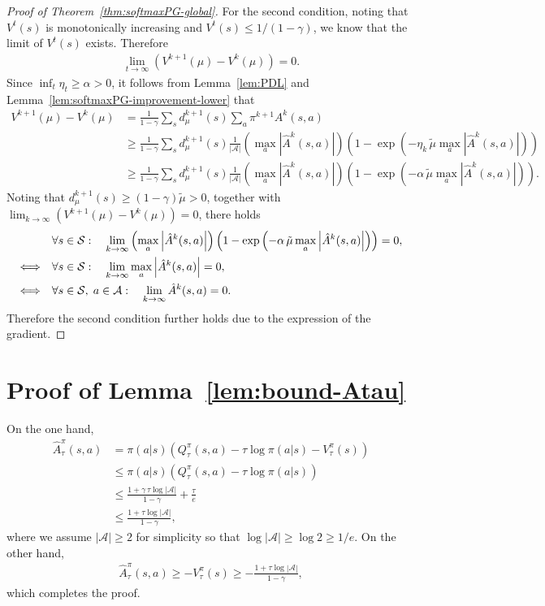 \begin{proof}[Proof of Theorem~\ref{thm:softmaxPG-global}]
    For the second condition, noting that $V^t(s)$ is monotonically increasing and $V^t(s) \leq 1/(1-\gamma)$, we know that the limit of $V^t(s)$ exists. Therefore
    \begin{align*}
        \lim_{t\to\infty} \left( V^{k+1}(\mu) - V^k(\mu) \right) = 0.
    \end{align*}
    Since $\inf_t \eta_t \geq \alpha> 0$, it follows from Lemma~\ref{lem:PDL} and Lemma~\ref{lem:softmaxPG-improvement-lower} that
    \begin{align*}
        V^{k+1}(\mu) - V^k(\mu) &= \frac{1}{1-\gamma} \sum_s d^{k+1}_\mu(s) \sum_{a} \pi^{k+1} A^k(s,a) \\
        &\geq \frac{1}{1-\gamma} \sum_s d^{k+1}_\mu(s) \frac{1}{|\mathcal{A}|}\left(\max_a|\hat{A}^k(s,a)|\right)\left(1-\exp\left(-\eta_k\,\tilde{\mu}\max_a|\hat{A}^k(s,a)|\right)\right)\\
        &\geq \frac{1}{1-\gamma} \sum_s d^{k+1}_\mu(s) \frac{1}{|\mathcal{A}|}\left(\max_a|\hat{A}^k(s,a)|\right)\left(1-\exp\left(-\alpha\,\tilde{\mu}\max_a|\hat{A}^k(s,a)|\right)\right).
    \end{align*}
    Noting that $d^{k+1}_\mu(s) \geq (1-\gamma)\tilde{\mu} > 0$, together with $\lim_{k\rightarrow\infty} \left( V^{k+1}(\mu) - V^k(\mu) \right) = 0$, there holds
    \begin{align*}
        &\forall s\in{\cal S}: \quad \lim_{k\to\infty} \left(\max_{a} \left| \hat{A}^k(s,a) \right|\right) \left( 1 - \exp\left( -\alpha\,\tilde{\mu} \max_a \left| \hat{A}^k(s,a) \right| \right) \right) = 0, \\
        \Longleftrightarrow \quad &\forall s\in{\cal S}: \quad \lim_{k\to\infty} \max_a \left| \hat{A}^k(s,a) \right| = 0, \\
        \Longleftrightarrow \quad &\forall s\in{\cal S},\; a\in{\cal A}: \quad \lim_{k\to\infty} \hat{A}^k(s,a) = 0.
    \end{align*}
    Therefore the second condition further holds due to the expression of the gradient. 
\end{proof}

\section{Proof of Lemma~\ref{lem:bound-Atau}}\label{sec:proof-bound-Atau}
On the one hand,
\begin{align*}
\hat{A}^\pi_\tau(s,a) &= \pi(a|s)\left(Q^\pi_\tau(s,a)-\tau\log\pi(a|s)-V_\tau^\pi(s)\right)\\
&\leq  \pi(a|s)\left(Q^\pi_\tau(s,a)-\tau\log\pi(a|s)\right)\\
&\leq \frac{1+\gamma\,\tau\log|\mathcal{A}|}{1-\gamma}+\frac{\tau}{e}\\
&\leq \frac{1+\tau\log|\mathcal{A}|}{1-\gamma},
\end{align*}
where we assume $|\mathcal{A}|\geq 2$ for simplicity so that $\log|\mathcal{A}|\geq \log 2\geq 1/e$. On the other hand,
\begin{align*}
\hat{A}^\pi_\tau(s,a) \geq - V_\tau^\pi(s)\geq -\frac{1+\tau\log|\mathcal{A}|}{1-\gamma},
\end{align*}
which completes the proof.

